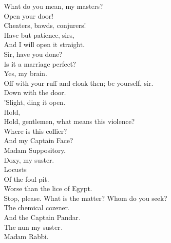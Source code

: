 \documentclass[a4paper,oneside,12pt]{memoir}
\begin{document}
\begin{drama*}
\scene

\lovewitspeaks What do you mean, my masters?\\
\mammonspeaks {} Open your door!\\
Cheaters, bawds, conjurers!\\
\lovewitspeaks {} Have but patience, sirs,\\
And I will open it straight.\\
\facespeaks {} Sir, have you done?\\
Is it a marriage perfect?\\
\lovewitspeaks {} Yes, my brain.\\
\facespeaks Off with your ruff and cloak then; be yourself, sir.\\
\surlyspeaks Down with the door.\\
\kastrilspeaks {} 'Slight, ding it open.\\
\lovewitspeaks {} Hold,\\
Hold, gentlemen, what means this violence?\\
\mammonspeaks Where is this collier?\\
\surlyspeaks {} And my Captain Face?\\
\mammonspeaks Madam Suppository.\\
\kastrilspeaks {} Doxy, my suster.\\
\persecutionspeaks {} Locusts\\
Of the foul pit.\\
\tribulationspeaks {} Worse than the lice of Egypt.\\
\lovewitspeaks Stop, please. What is the matter? Whom do you seek?\\
\mammonspeaks The chemical cozener.\\
\surlyspeaks {} And the Captain Pandar.\\
\kastrilspeaks The nun my suster.\\
\mammonspeaks {} Madam Rabbi.\\

\end{drama*}
\end{document}
